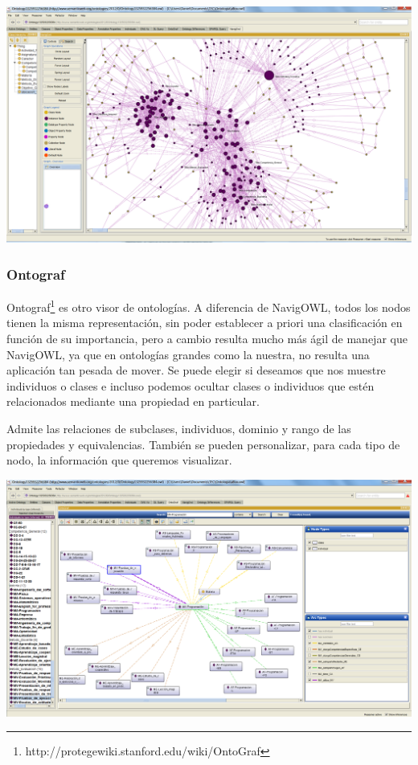 \begin{center}
		\includegraphics[width=1.00\textwidth]{Imagenes/Herramientas-NavigOwl.png}
\end{center}

\subsubsection{Ontograf} Ontograf\footnote{http://protegewiki.stanford.edu/wiki/OntoGraf} es otro visor de ontologías. A diferencia de NavigOWL, todos los nodos tienen la misma representación, sin poder establecer a priori una clasificación en función de su importancia, pero a cambio resulta mucho más ágil de manejar que NavigOWL, ya que en ontologías grandes como la nuestra, no resulta una aplicación tan pesada de mover. Se puede elegir si deseamos que nos muestre individuos o clases e incluso podemos ocultar clases o individuos que estén relacionados mediante una propiedad en particular.

Admite las relaciones de subclases, individuos, dominio y rango de las propiedades y equivalencias. También se pueden personalizar, para cada tipo de nodo, la información que queremos visualizar.


\begin{center}
		\includegraphics[width=1.00\textwidth]{Imagenes/Herramientas-OntoGraf.png}
\end{center}

